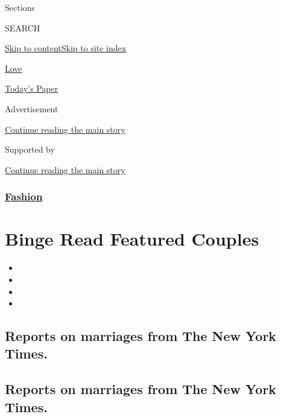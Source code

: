 Sections

SEARCH

\protect\hyperlink{site-content}{Skip to
content}\protect\hyperlink{site-index}{Skip to site index}

\href{https://www.nytimes3xbfgragh.onion/spotlight/wedding-announcements}{Love}

\href{https://myaccount.nytimes3xbfgragh.onion/auth/login?response_type=cookie\&client_id=vi}{}

\href{https://www.nytimes3xbfgragh.onion/section/todayspaper}{Today's
Paper}

Advertisement

\protect\hyperlink{after-top}{Continue reading the main story}

Supported by

\protect\hyperlink{after-sponsor}{Continue reading the main story}

\hypertarget{fashion}{%
\subsubsection{\texorpdfstring{\href{/section/fashion}{Fashion}}{Fashion}}\label{fashion}}

\hypertarget{binge-read-featured-couples}{%
\section{Binge Read Featured
Couples}\label{binge-read-featured-couples}}

\begin{itemize}
\item
\item
\item
\item
\end{itemize}

\hypertarget{reports-on-marriages-from-the-new-york-times}{%
\subsection{Reports on marriages from The New York
Times.}\label{reports-on-marriages-from-the-new-york-times}}

\hypertarget{reports-on-marriages-from-the-new-york-times-1}{%
\subsection{Reports on marriages from The New York
Times.}\label{reports-on-marriages-from-the-new-york-times-1}}

